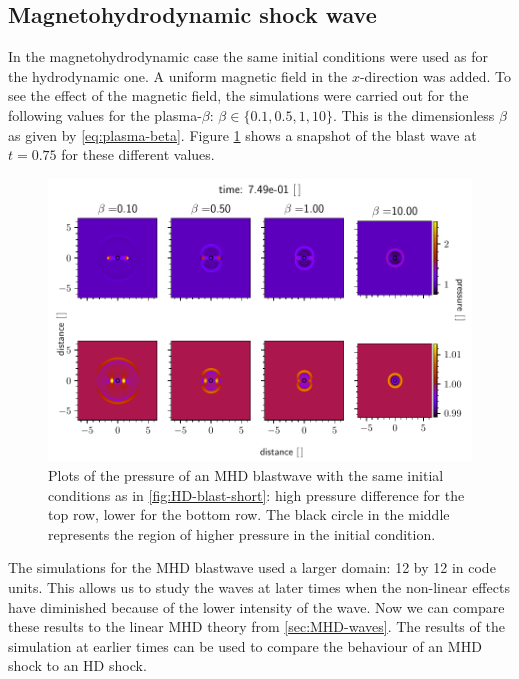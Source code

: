 \subsection{Magnetohydrodynamic shock wave}
In the magnetohydrodynamic case the same initial conditions were used as for the hydrodynamic one.
A uniform magnetic field in the $x$-direction was added. 
To see the effect of the magnetic field, the simulations were carried out for the following values for the plasma-$\beta$: $\beta \in \{0.1, 0.5,1,10\}$.
This is the dimensionless $\beta$ as given by \cref{eq:plasma-beta}.
Figure \ref{fig:MHD-blasts} shows a snapshot of the blast wave at $t=0.75$ for these different values.

\begin{figure}[H]
	\centering
	\includegraphics[width=\linewidth]{images/MHD-blasts.pdf}
	\caption{Plots of the pressure of an MHD blastwave with the same initial conditions as in \cref{fig:HD-blast-short}: high pressure difference for the top row, lower for the bottom row.
	The black circle in the middle represents the region of higher pressure in the initial condition.}
	\label{fig:MHD-blasts}
\end{figure}

The simulations for the MHD blastwave used a larger domain: 12 by 12 in code units.
This allows us to study the waves at later times when the non-linear effects have diminished because of the lower intensity of the wave.
Now we can compare these results to the linear MHD theory from \cref{sec:MHD-waves}.
The results of the simulation at earlier times can be used to compare the behaviour of an MHD shock to an HD shock.

